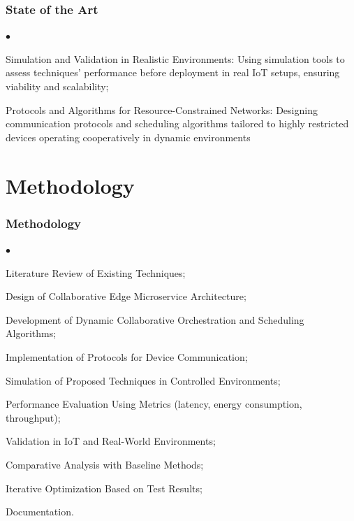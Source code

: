 \documentclass[tikz]{beamer}
\begin{document}
\begin{frame}
\frametitle{State of the Art}
\begin{list}{$\bullet$}{}
    \item Simulation and Validation in Realistic Environments: Using simulation tools to assess techniques' performance before deployment in real IoT setups, ensuring viability and scalability;
    \item Protocols and Algorithms for Resource-Constrained Networks: Designing communication protocols and scheduling algorithms tailored to highly restricted devices operating cooperatively in dynamic environments
    
\end{list}
\end{frame}

\section{Methodology}
\begin{frame}
\frametitle{Methodology}
\begin{list}{$\bullet$}{}
    \item Literature Review of Existing Techniques;
    \item Design of Collaborative Edge Microservice Architecture;
    \item Development of Dynamic Collaborative Orchestration and Scheduling Algorithms;
    \item Implementation of Protocols for Device Communication;
    \item Simulation of Proposed Techniques in Controlled Environments;
    \item Performance Evaluation Using Metrics (latency, energy consumption, throughput);
    \item Validation in IoT and Real-World Environments;
    \item Comparative Analysis with Baseline Methods;
    \item Iterative Optimization Based on Test Results;
    \item Documentation.
\end{list}
\end{frame}
\end{document}
